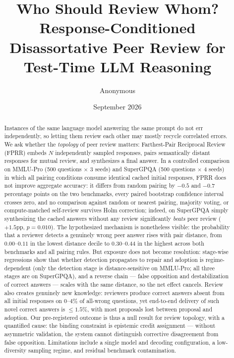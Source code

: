 \documentclass[11pt]{article}
\title{Who Should Review Whom?\\Response-Conditioned Disassortative Peer Review for Test-Time LLM Reasoning}
\author{Anonymous}
\date{September 2026}
\begin{document}
\maketitle

\begin{abstract}
Instances of the same language model answering the same prompt do not err independently, so letting them review each other may mostly recycle correlated errors. We ask whether the \emph{topology} of peer review matters: Farthest-Pair Reciprocal Review (FPRR) embeds $N$ independently sampled responses, pairs semantically distant responses for mutual review, and synthesizes a final answer. In a controlled comparison on MMLU-Pro (500 questions $\times$ 3 seeds) and SuperGPQA (500 questions $\times$ 4 seeds) in which all pairing conditions consume identical cached initial responses, FPRR does not improve aggregate accuracy: it differs from random pairing by $-0.5$ and $-0.7$ percentage points on the two benchmarks, every paired bootstrap confidence interval crosses zero, and no comparison against random or nearest pairing, majority voting, or compute-matched self-review survives Holm correction; indeed, on SuperGPQA simply synthesizing the cached answers without any review significantly \emph{beats} peer review ($+1.5$pp, $p=0.010$). The hypothesized mechanism is nonetheless visible: the probability that a reviewer detects a genuinely wrong peer answer rises with pair distance, from $0.00$--$0.11$ in the lowest distance decile to $0.30$--$0.44$ in the highest across both benchmarks and all pairing rules. But exposure does not become resolution: stage-wise regressions show that whether detection propagates to repair and adoption is regime-dependent (only the detection stage is distance-sensitive on MMLU-Pro; all three stages are on SuperGPQA), and a reverse chain --- false opposition and destabilization of correct answers --- scales with the same distance, so the net effect cancels. Review also creates genuinely new knowledge: reviewers produce correct answers absent from all initial responses on $0$--$4\%$ of all-wrong questions, yet end-to-end delivery of such novel correct answers is $\le 1.5\%$, with most proposals lost between proposal and adoption. Our pre-registered outcome is thus a null result for review topology, with a quantified cause: the binding constraint is epistemic credit assignment --- without asymmetric validation, the system cannot distinguish corrective disagreement from false opposition. Limitations include a single model and decoding configuration, a low-diversity sampling regime, and residual benchmark contamination.
\end{abstract}
\end{document}

